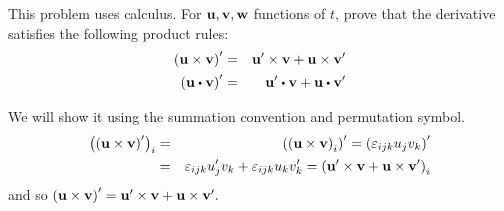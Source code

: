\begin{enumialphparenastyle}
\begin{ex} This problem uses calculus. For
  $\mbox{\bf u},\mbox{\bf v},\mbox{\bf w}$ functions of $t$, prove that the
  derivative satisfies the following product rules:
  \begin{eqnarray*}
    \tup{\vect{u}\times \vect{v}} ^{\prime } &=&\vect{u}^{\prime }\times
                                                 \vect{v}+\vect{u}\times \vect{v}^{\prime } \\
    \tup{\vect{u}\dotprod \vect{v}} ^{\prime } &=&\vect{u}^{\prime }\dotprod
                                                   \vect{v}+\vect{u}\dotprod \vect{v}^{\prime }
  \end{eqnarray*}
  \begin{sol}
    We will show it using the summation convention and permutation symbol.
    \begin{eqnarray*}
      \left(\left(\mbox{\bf u}\times \mbox{\bf v}\right) ^{\prime }\right) _{i} &=
      &\left(\left(\mbox{\bf u}\times \mbox{\bf v}\right) _{i}\right) ^{\prime }=\left(
        \varepsilon _{ijk}u_{j}v_{k}\right) ^{\prime } \\
                                                          &=&\varepsilon _{ijk}u_{j}^{\prime }v_{k}+\varepsilon
                                                              _{ijk}u_{k}v_{k}^{\prime }=\left(\mbox{\bf u}^{\prime } \times
                                                              \mbox{\bf v}+\mbox{\bf u}\times \mbox{\bf v}^{\prime }\right) _{i}
    \end{eqnarray*}
    and so $\left(\mbox{\bf u}\times \mbox{\bf v}\right) ^{\prime }=\mbox{\bf u}^{\prime }
    \times \mbox{\bf v}+\mbox{\bf u}\times \mbox{\bf v}^{\prime }.$ 
  \end{sol}
\end{ex}

\end{enumialphparenastyle}
